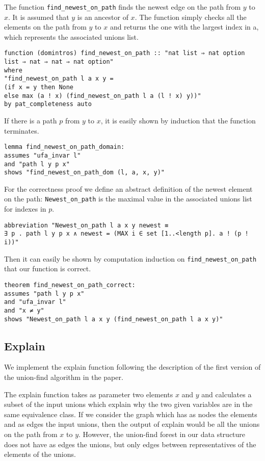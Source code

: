The function \lstinline{find_newest_on_path} finds the newest edge on the path from $y$ to $x$. It is assumed that $y$ is an ancestor of $x$. The function simply checks all the elements on the path from $y$ to $x$ and returns the one with the largest index in a, which represents the associated unions list.

\begin{lstlisting}
function (domintros) find_newest_on_path :: "nat list ⇒ nat option list ⇒ nat ⇒ nat ⇒ nat option"
where
"find_newest_on_path l a x y =
(if x = y then None
else max (a ! x) (find_newest_on_path l a (l ! x) y))"
by pat_completeness auto
\end{lstlisting}

If there is a path $p$ from $y$ to $x$, it is easily shown by induction that the function terminates.

\begin{lstlisting}
lemma find_newest_on_path_domain:
assumes "ufa_invar l"
and "path l y p x"
shows "find_newest_on_path_dom (l, a, x, y)"
\end{lstlisting}

For the correctness proof we define an abstract definition of the newest element on the path: \lstinline{Newest_on_path} is the maximal value in the associated unions list for indexes in $p$.

\begin{lstlisting}
abbreviation "Newest_on_path l a x y newest ≡
∃ p . path l y p x ∧ newest = (MAX i ∈ set [1..<length p]. a ! (p ! i))"
\end{lstlisting}

Then it can easily be shown by computation induction on \lstinline{find_newest_on_path} that our function is correct.

\begin{lstlisting}
theorem find_newest_on_path_correct:
assumes "path l y p x"
and "ufa_invar l"
and "x ≠ y"
shows "Newest_on_path l a x y (find_newest_on_path l a x y)"
\end{lstlisting}

\subsection{Explain}

We implement the explain function following the description of the first version of the union-find algorithm in the paper\cite{Nieuwenhuis}.

The explain function takes as parameter two elements $x$ and $y$ and calculates a subset of the input unions which explain why the two given variables are in the same equivalence class. If we consider the graph which has as nodes the elements and as edges the input unions, then the output of explain would be all the unions on the path from $x$ to $y$. However, the union-find forest in our data structure does not have as edges the unions, but only edges between representatives of the elements of the unions.


